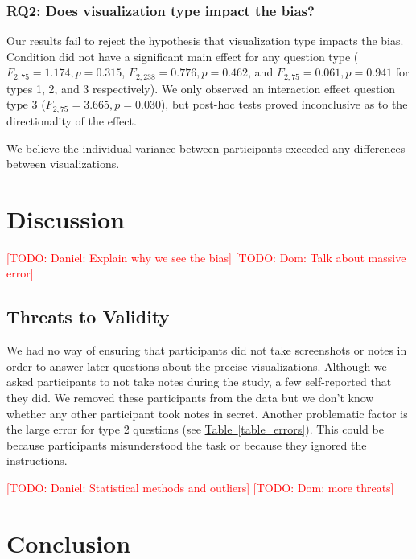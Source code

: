 \documentclass[10pt,journal,compsoc]{IEEEtran}
\newcommand{\tabref}[1]{\hyperref[#1]{Table~\ref*{#1}}}
\newcommand{\note}[2]{\textcolor{#1}{[#2]}}
\newcommand{\todo}[1]{\note{red}{TODO: #1}}
\begin{document}
\subsubsection{RQ2: Does visualization type impact the bias?}

Our results fail to reject the hypothesis that visualization type impacts the bias.
Condition did not have a significant main effect for any question type ($F_{2,75}=1.174, p=0.315$, $F_{2,238}=0.776, p=0.462$, and $F_{2,75}=0.061, p=0.941$ for types 1, 2, and 3 respectively).
We only observed an interaction effect question type 3 ($F_{2,75}=3.665, p=0.030$), but post-hoc tests proved inconclusive as to the directionality of the effect.

We believe the individual variance between participants exceeded any differences between visualizations.

\section{Discussion}\label{sec:discussion}

\todo{Daniel: Explain why we see the bias}
\todo{Dom: Talk about massive error}

\subsection{Threats to Validity} %

We had no way of ensuring that participants did not take screenshots or notes in order to answer later questions about the precise visualizations.
Although we asked participants to not take notes during the study, a few self-reported that they did.
We removed these participants from the data but we don't know whether any other participant took notes in secret.
Another problematic factor is the large error for type 2 questions (see \tabref{table_errors}).
This could be because participants misunderstood the task or because they ignored the instructions.

\todo{Daniel: Statistical methods and outliers}
\todo{Dom: more threats}

\section{Conclusion}
\end{document}
